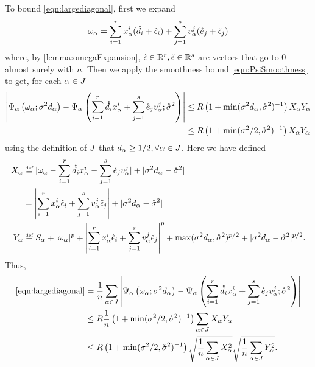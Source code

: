 \documentclass[main.tex]{subfiles}
\begin{document}
To bound \cref{eqn:largediagonal}, first we expand
\[
\omega_\alpha =
\sum_{i=1}^r x_\alpha^i (\mathring {d}_i + \hat \epsilon_i)
+ \sum_{j=1}^s v_\alpha^j (\mathring {e}_j + \check \epsilon_j)
\]
where, by \cref{lemma:omegaExpansion}, $\hat \epsilon \in \mathbb{R}^r, \check \epsilon \in \mathbb{R}^s$ are vectors that go to 0 almost surely with $n$.
Then we apply the smoothness bound \cref{eqn:PsiSmoothness} to get, for each $\alpha \in J$
\begin{align*}
    \left|
    \Psi_\alpha\left( \omega_\alpha; \sigma^2 d_\alpha\right)
    -
    \Psi_\alpha\left(
      \sum_{i=1}^r \mathring {d}_i x^i_\alpha +
        \sum_{j=1}^s \mathring {e}_j v^j_\alpha
        ; \mathring \sigma^2 \right)
    \right|
    &\le
        R
        \left( 1 + \min(\sigma^2 d_\alpha, \mathring \sigma^2)^{-1} \right)
        X_\alpha
        Y_\alpha
        \\
    &\le
        R
        \left( 1 + \min(\sigma^2/2, \mathring \sigma^2)^{-1} \right)
        X_\alpha
        Y_\alpha
\end{align*}
using the definition of $J$ that $d_\alpha \ge 1/2, \forall \alpha \in J$.
Here we have defined
\begin{align*}
X_\alpha
    &\defeq
        |\omega_\alpha - 
          \sum_{i=1}^r \mathring {\dme}_i \xme^i_\alpha -
            \sum_{j=1}^s \mathring {\eme}_j \vme^j_\alpha|
        + |\sigma^2 d_\alpha - \mathring \sigma^2|
        \\
    &=
        \left|\sum_{i=1}^r \xme_\alpha^i \hat \epsilon_i
                + \sum_{j=1}^s \vme_\alpha^j \check \epsilon_j
        \right|
        + |\sigma^2 d_\alpha - \mathring \sigma^2|
        \\
Y_\alpha
    &\defeq
        S_\alpha + |\omega_\alpha|^p
        + \left|\sum_{i=1}^r \xme_\alpha^i \hat \epsilon_i
                + \sum_{j=1}^s \vme_\alpha^j \check \epsilon_j
        \right|^p
        + \max(\sigma^2 d_\alpha, \mathring \sigma^2)^{p/2}
        + |\sigma^2 d_\alpha - \mathring \sigma^2|^{p/2}
        .
        \\
\end{align*}
Thus,
\begin{align*}
\cref{eqn:largediagonal}
    &=
        \f 1 n \sum_{\alpha\in \JJc}
        \left|
        \Psi_\alpha\lp \omega_\alpha; \sigma^2 d_\alpha\rp
        -
        \Psi_\alpha\lp
          \sum_{i=1}^r \mathring {\dme}_i \xme^i_\alpha +
            \sum_{j=1}^s \mathring {\eme}_j \vme^j_\alpha;
          \mathring \sigma^2 \rp
        \right|
        \\
    &\le
        R
        \f 1 n
        \lp 1 + \min(\sigma^2/2, \mathring \sigma^2)^{-1} \rp
        \sum_{\alpha \in \JJc}
            X_\alpha
            Y_\alpha
        \\
    &\le
        R
        \lp 1 + \min(\sigma^2/2, \mathring \sigma^2)^{-1} \rp
        \sqrt{\f 1 n \sum_{\alpha \in \JJc}
            X_\alpha^2}
        \sqrt{\f 1 n \sum_{\alpha \in \JJc}
            Y_\alpha^2
            }
        .
\end{align*}
\end{document}
